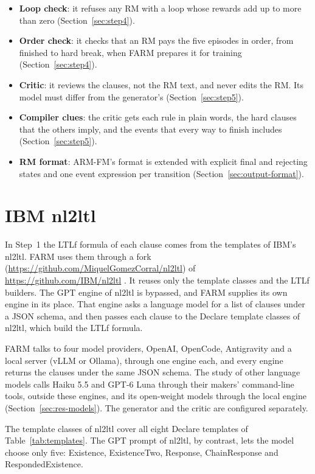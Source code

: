 \documentclass[11pt,english,listoffigures,listoftables]{tfgetsinf}
\begin{document}
\begin{itemize}
    \item \textbf{Loop check}: it refuses any RM with a loop whose rewards add up to more than zero (Section~\ref{sec:step4}).
    \item \textbf{Order check}: it checks that an RM pays the five episodes in order, from finished to hard break, when FARM prepares it for training (Section~\ref{sec:step4}).
    \item \textbf{Critic}: it reviews the clauses, not the RM text, and never edits the RM. Its model must differ from the generator's (Section~\ref{sec:step5}).
    \item \textbf{Compiler clues}: the critic gets each rule in plain words, the hard clauses that the others imply, and the events that every way to finish includes (Section~\ref{sec:step5}).
    \item \textbf{RM format}: ARM-FM's format is extended with explicit final and rejecting states and one event expression per transition (Section~\ref{sec:output-format}).
\end{itemize}

\section{IBM nl2ltl}
In Step~1 the LTLf formula of each clause comes from the templates of IBM's nl2ltl. FARM uses them through a fork (\url{https://github.com/MiquelGomezCorral/nl2ltl}) of \url{https://github.com/IBM/nl2ltl} \cite{nl2ltl_code}. It reuses only the template classes and the LTLf builders. The GPT engine of nl2ltl is bypassed, and FARM supplies its own engine in its place. That engine asks a language model for a list of clauses under a JSON schema, and then passes each clause to the Declare template classes of nl2ltl, which build the LTLf formula.

FARM talks to four model providers, OpenAI, OpenCode, Antigravity and a local server (vLLM or Ollama), through one engine each, and every engine returns the clauses under the same JSON schema. The study of other language models calls Haiku 5.5 and GPT-6 Luna through their makers' command-line tools, outside these engines, and its open-weight models through the local engine (Section~\ref{sec:res-models}). The generator and the critic are configured separately.

The template classes of nl2ltl cover all eight Declare templates of Table~\ref{tab:templates}. The GPT prompt of nl2ltl, by contrast, lets the model choose only five: Existence, ExistenceTwo, Response, \mbox{ChainResponse} and RespondedExistence.
\end{document}
